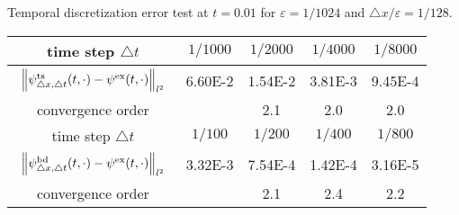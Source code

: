 \documentclass[leqno,final]{siamltex}
\numberwithin{equation}{section}
\newcounter{me}
\begin{document}
\begin{table}[htbp]
\begin{center}
{Temporal discretization error test at $t=0.01$ for ${{\varepsilon }}=1/1024$
and ${\triangle} x/{{\varepsilon }}=1/128$.}
\begin{tabular}{c|cccc}\hline
time step ${\triangle} t$& $1/1000$ & $1/2000$ & $1/4000$ &   $1/8000$ \\
\hline
$\begin{array}{c}\vspace*{-4mm} \\
\left\|\psi^{\rm ts}_{{\triangle} x,{\triangle} t}(t,\cdot)-\psi^{\rm
ex}(t,\cdot)\right\|_{l^2}\\ \vspace*{-4mm} \end{array}$
 &  6.60E-2 & 1.54E-2 &  3.81E-3 & 9.45E-4 \\ \hline
convergence order & & 2.1 & 2.0& 2.0 \\ \hline \hline time step
${\triangle} t$& $1/100$ & $1/200$ & $1/400$ &   $1/800$ \\ \hline
$\begin{array}{c}\vspace*{-4mm} \\
\left\|\psi^{\rm bd}_{{\triangle} x,{\triangle} t}(t,\cdot)-\psi^{\rm
ex}(t,\cdot)\right\|_{l^2}\\ \vspace*{-4mm} \end{array}$
 &  3.32E-3& 7.54E-4 &  1.42E-4 & 3.16E-5 \\ \hline
convergence order & & 2.1 & 2.4& 2.2  \\ \hline 
\end{tabular}
\end{center}
\end{table}
\end{document}
